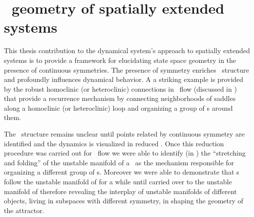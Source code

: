 
\section{\Statesp\ geometry of spatially extended systems}


This thesis contribution to the dynamical system's approach
to spatially extended systems is to provide a framework for
elucidating state space geometry in the presence of
continuous symmetries. The presence of symmetry enriches
\statesp\ structure and profoundly influences dynamical
behavior. A a striking example is provided by the robust
homoclinic (or heteroclinic) connections in \KS\ flow
(discussed in ) that provide a
recurrence mechanism by connecting neighborhoods of saddles
along a homoclinic (or heteroclinic) loop and organizing a
group of {\rpo s} around them.

The  \statesp\ structure remains unclear until points related
by continuous symmetry are identified and the dynamics is visualized in
reduced \statesp. Once this reduction procedure was carried out for \KS\ flow
we were able to identify (in ) the
``stretching and folding'' of the unstable manifold of a \reqv\ as
the mechanism responsible for organizing a different group of \rpo s. Moreover
we were able to demonstrate that \rpo s  follow the unstable manifold of 
for a while until carried over to the unstable manifold of  therefore
revealing the interplay of unstable manifolds of different objects, living
in subspaces with different symmetry, in shaping the geometry of the attractor.

